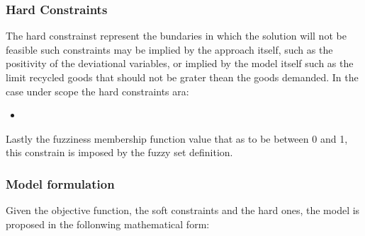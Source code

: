 \documentclass{article}
\begin{document}
\subsubsection{Hard Constraints}
The hard constrainst represent the bundaries in which the solution will not be feasible such constraints may be implied by the approach itself, such as the positivity of the deviational variables, or implied by the model itself such as the limit recycled goods that should not be grater thean the goods demanded. In the case under scope the hard constraints ara:
\begin{itemize}
\item
\end{itemize}
Lastly the fuzziness membership function value that as to be between 0 and 1, this constrain is imposed by the fuzzy set definition.

\subsubsection{Model formulation}
Given the objective function, the soft constraints and the hard ones, the model is proposed in the follonwing mathematical form:
\end{document}
